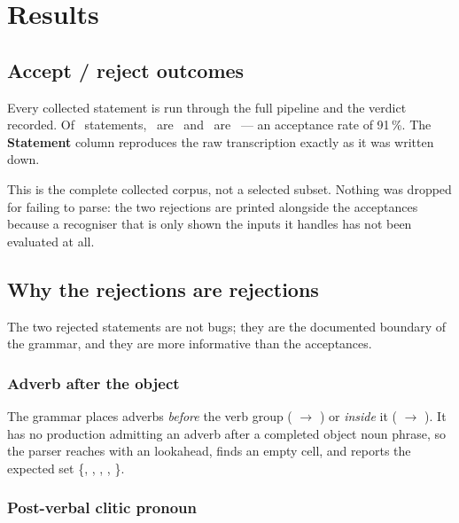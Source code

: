 \section{Results}\label{sec:results}

\subsection{Accept / reject outcomes}

Every collected statement is run through the full pipeline and the verdict recorded. Of
\CorpusTotal\ statements, \CorpusAccepted\ are \accepted\ and \CorpusRejected\ are
\rejected\ --- an acceptance rate of 91\,\%. The \textbf{Statement} column reproduces the
raw transcription exactly as it was written down.



\begin{keypoint}
This is the complete collected corpus, not a selected subset. Nothing was dropped for
failing to parse: the two rejections are printed alongside the acceptances because a
recogniser that is only shown the inputs it handles has not been evaluated at all.
\end{keypoint}

\subsection{Why the rejections are rejections}

The two rejected statements are not bugs; they are the documented boundary of the grammar,
and they are more informative than the acceptances.

\subsubsection*{Adverb after the object}

The grammar places adverbs \emph{before} the verb group ( $\rightarrow$
 ) or \emph{inside} it ( $\rightarrow$
 ). It has no production admitting an adverb after a completed
object noun phrase, so the parser reaches  with an  lookahead,
finds an empty cell, and reports the expected set
\{, , , , \}.

\subsubsection*{Post-verbal clitic pronoun}

